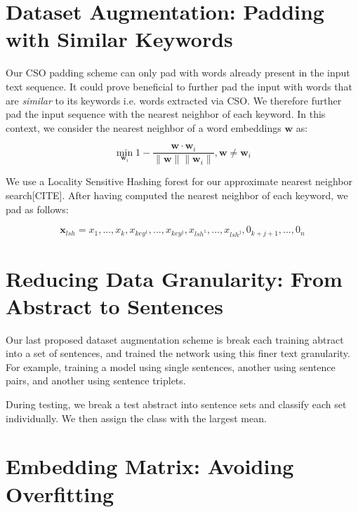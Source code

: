 \section{Dataset Augmentation: Padding with Similar Keywords}
Our CSO padding scheme can only pad with words already present in the input
text sequence. It could prove beneficial to further pad the input with words that are \textit{similar}
to its keywords i.e. words extracted via CSO. We therefore further pad the input sequence
with the nearest neighbor of each keyword. In this context, we consider the nearest neighbor
of a word embeddings $\bm{w}$ as:

\[\min_{\bm{w}_i} 1 - \frac{\bm{w} \cdot \bm{w}_i}{\lVert \bm{w} \rVert \lVert \bm{w}_i \rVert}, \bm{w} \neq \bm{w}_i\]

We use a Locality Sensitive Hashing forest for our approximate nearest neighbor search[CITE].
After having computed the nearest neighbor of each keyword, we pad as follows:

\[\bm{x}_{lsh} = x_1, ..., x_k, x_{key^1}, ..., x_{key^j},x_{lsh^1}, ..., x_{lsh^j}, 0_{k+j+1}, ..., 0_n\]

\section{Reducing Data Granularity: From Abstract to Sentences}
Our last proposed dataset augmentation scheme is break each training abtract into a set of sentences, and trained
the network using this finer text granularity. For example, training a model using single sentences, another using sentence pairs,
and another using sentence triplets.

During testing, we break a test abstract into sentence sets and classify each set individually. We then assign
the class with the largest mean.

\section{Embedding Matrix: Avoiding Overfitting}
